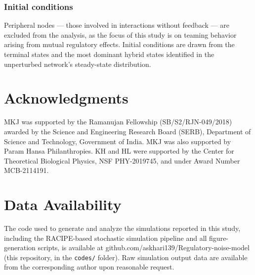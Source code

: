 \documentclass[11pt]{article}
\newcommand{\beginsupplement}{%
        \setcounter{table}{0}
        \renewcommand{\thetable}{S\arabic{table}}%
        \setcounter{figure}{0}
        \renewcommand{\thefigure}{S\arabic{figure}}%
        \setcounter{section}{0}
        \renewcommand{\thesection}{S\arabic{section}}%
     }
\begin{document}
\subsubsection{Initial conditions}

Peripheral nodes — those involved in interactions without feedback — are excluded from the analysis, as the focus of this study is on teaming behavior arising from mutual regulatory effects. Initial conditions are drawn from the terminal states and the most dominant hybrid states identified in the unperturbed network's steady-state distribution.

\section{Acknowledgments}

MKJ was supported by the Ramanujan Fellowship (SB/S2/RJN-049/2018) awarded by the Science and Engineering Research Board (SERB), Department of Science and Technology, Government of India. MKJ was also supported by Param Hansa Philanthropies. KH and HL were supported by the Center for Theoretical Biological Physics, NSF PHY-2019745, and under Award Number MCB-2114191.

\section{Data Availability}

The code used to generate and analyze the simulations reported in this study, including the RACIPE-based stochastic simulation pipeline and all figure-generation scripts, is available at github.com/askhari139/Regulatory-noise-model (this repository, in the \texttt{codes/} folder). Raw simulation output data are available from the corresponding author upon reasonable request.

\printbibliography

\beginsupplement



% 
% 
\clearpage

\newpage
\clearpage

        
\end{document}
